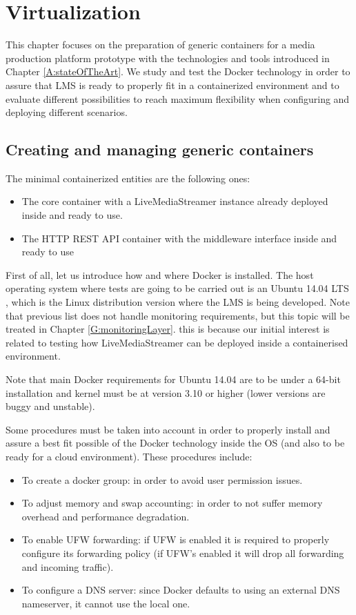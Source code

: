 \chapter{Virtualization}\label{D:virtualization}

This chapter focuses on the preparation of generic containers for a media production platform prototype with the technologies and tools introduced in Chapter \ref{A:stateOfTheArt}. We study and test the Docker technology in order to assure that LMS is ready to properly fit in a containerized environment and to evaluate different possibilities to reach maximum flexibility when configuring and deploying different scenarios.

\section{Creating and managing generic containers}
The minimal containerized entities are the following ones:

\begin{itemize}
\item The core container with a LiveMediaStreamer instance already deployed inside and ready to use.
\item The HTTP REST API container with the middleware interface inside and ready to use
\end{itemize}

First of all, let us introduce how and where Docker is installed. The host operating system where tests are going to be carried out is an Ubuntu 14.04 LTS \cite{ubuntu}, which is the Linux distribution version where the LMS is being developed. Note that previous list does not handle monitoring requirements, but this topic will be treated in Chapter \ref{G:monitoringLayer}. this is because our initial interest is related to testing how LiveMediaStreamer can be deployed inside a containerised environment.

Note that main Docker requirements for Ubuntu 14.04 are to be under a 64-bit installation and kernel must be at version 3.10 or higher (lower versions are buggy and unstable). 

Some procedures must be taken into account in order to properly install and assure a best fit possible of the Docker technology inside the OS (and also to be ready for a cloud environment). These procedures include:

\begin{itemize}
\item To create a docker group: in order to avoid user permission issues.
\item To adjust memory and swap accounting: in order to not suffer memory overhead and performance degradation.
\item To enable UFW forwarding: if UFW is enabled it is required to properly configure its forwarding policy (if UFW's enabled it will drop all forwarding and incoming traffic).
\item To configure a DNS server: since Docker defaults to using an external DNS nameserver, it cannot use the local one.
\end{itemize}

